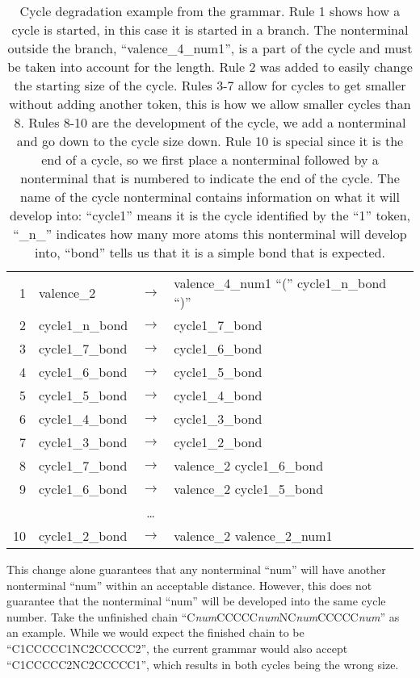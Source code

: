 \documentclass[../Document.tex]{subfiles}
\begin{document}
\begin{table}[ht]
    \centering
    \begin{tabular}{r | l c l}
        1 & valence\_2 & $\rightarrow$ & valence\_4\_num1 ``('' cycle1\_n\_bond ``)'' \\
        2 & cycle1\_n\_bond & $\rightarrow$ & cycle1\_7\_bond \\
        3 & cycle1\_7\_bond & $\rightarrow$ & cycle1\_6\_bond \\
        4 & cycle1\_6\_bond & $\rightarrow$ & cycle1\_5\_bond \\
        5 & cycle1\_5\_bond & $\rightarrow$ & cycle1\_4\_bond \\
        6 & cycle1\_4\_bond & $\rightarrow$ & cycle1\_3\_bond \\
        7 & cycle1\_3\_bond & $\rightarrow$ & cycle1\_2\_bond \\
        8 & cycle1\_7\_bond & $\rightarrow$ & valence\_2 cycle1\_6\_bond \\
        9 & cycle1\_6\_bond & $\rightarrow$ & valence\_2 cycle1\_5\_bond \\
        & & \ldots & \\
        10 & cycle1\_2\_bond & $\rightarrow$ & valence\_2 valence\_2\_num1 \\
    \end{tabular}
    \caption[Cycle degradation example from the grammar]{Cycle degradation example from the grammar.
    Rule 1 shows how a cycle is started, in this case it is started in a branch. The nonterminal outside the branch, ``valence\_4\_num1'', is a part of the cycle and must be taken into account for the length.
    Rule 2 was added to easily change the starting size of the cycle.
    Rules 3-7 allow for cycles to get smaller without adding another token, this is how we allow smaller cycles than 8.
    Rules 8-10 are the development of the cycle, we add a nonterminal and go down to the cycle size down.
    Rule 10 is special since it is the end of a cycle, so we first place a nonterminal followed by a nonterminal that is numbered to indicate the end of the cycle.
    The name of the cycle nonterminal contains information on what it will develop into: ``cycle1'' means it is the cycle identified by the ``1'' token, ``\_n\_'' indicates how many more atoms this nonterminal will develop into, ``bond'' tells us that it is a simple bond that is expected.}
    \label{tab:grammar-cycle-degradation}
\end{table}

This change alone guarantees that any nonterminal ``num'' will have another nonterminal ``num'' within an acceptable distance.
However, this does not guarantee that the nonterminal ``num'' will be developed into the same cycle number.
Take the unfinished chain ``C\textit{num}CCCCC\textit{num}NC\textit{num}CCCCC\textit{num}'' as an example.
While we would expect the finished chain to be ``C1CCCCC1NC2CCCCC2'', the current grammar would also accept \\
``C1CCCCC2NC2CCCCC1'', which results in both cycles being the wrong size.
\end{document}
